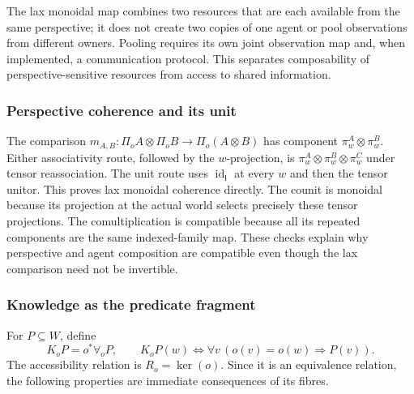 \documentclass[11pt,a4paper]{article}
\numberwithin{equation}{section}
\theoremstyle{definition}
\theoremstyle{remark}
\theoremstyle{plain}
\providecommand{\I}{\mathsf{I}}
\providecommand{\id}{\mathop{\mathrm{id}}}
\providecommand{\kerpair}{\mathop{\mathrm{ker}}}
\begin{document}
The lax monoidal map combines two resources that are each available
from the same perspective; it does not create two copies of one agent
or pool observations from different owners. Pooling requires its own
joint observation map and, when implemented, a communication protocol.
This separates composability of perspective-sensitive resources from
access to shared information.

\subsubsection{Perspective coherence and its unit}

The comparison $m_{A,B}:\Pi_oA\otimes\Pi_oB\to\Pi_o(A\otimes B)$
has component $\pi_w^A\otimes\pi_w^B$. Either associativity route,
followed by the $w$-projection, is
$\pi_w^A\otimes\pi_w^B\otimes\pi_w^C$ under tensor reassociation.
The unit route uses $\id_\I$ at every $w$ and then the tensor unitor.
This proves lax monoidal coherence directly. The counit is monoidal because
its projection at the actual world selects precisely these tensor
projections. The comultiplication is compatible because all its repeated
components are the same indexed-family map. These checks explain why
perspective and agent composition are compatible even though the lax
comparison need not be invertible.

\subsubsection{Knowledge as the predicate fragment}

For $P\subseteq W$, define
\[
 K_oP=o^*\forall_oP,
 \qquad
 K_oP(w)\iff\forall v\,(o(v)=o(w)\Rightarrow P(v)).
\]
The accessibility relation is $R_o=\kerpair(o)$. Since it is an equivalence
relation, the following properties are immediate consequences of its fibres.
\end{document}
